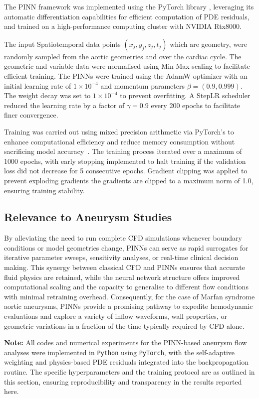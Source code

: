 \documentclass{article}
\begin{document}
The PINN framework was implemented using the PyTorch library \citep{paszke2019pytorch}, leveraging its automatic differentiation capabilities for efficient computation of PDE residuals, and trained on a high-performance computing cluster with NVIDIA Rtx8000. 

The input Spatiotemporal data points $(x_j, y_j, z_j, t_j)$ which are geometry, were randomly sampled from the aortic geometries and over the cardiac cycle. The geometric and variable data were normalised using Min-Max scaling to facilitate efficient training. The PINNs were trained using the AdamW optimizer \citep{loshchilov2017decoupled} with an initial learning rate of $1 \times 10^{-4}$ and momentum parameters $\beta = (0.9, 0.999)$. The weight decay was set to $1 \times 10^{-4}$ to prevent overfitting. A StepLR scheduler reduced the learning rate by a factor of $\gamma = 0.9$ every 200 epochs to facilitate finer convergence.

Training was carried out using mixed precision arithmetic via PyTorch's to enhance computational efficiency and reduce memory consumption without sacrificing model accuracy~\cite{micikevicius2017mixed}. The training process iterated over a maximum of 1000 epochs, with early stopping implemented to halt training if the validation loss did not decrease for 5 consecutive epochs. Gradient clipping was applied to prevent exploding gradients the gradients are clipped to a maximum norm of 1.0, ensuring training stability.

\subsection{Relevance to Aneurysm Studies}
By alleviating the need to run complete CFD simulations whenever boundary conditions or model geometries change, PINNs can serve as rapid surrogates for iterative parameter sweeps, sensitivity analyses, or real-time clinical decision making. This synergy between classical CFD and PINNs ensures that accurate fluid physics are retained, while the neural network structure offers improved computational scaling and the capacity to generalise to different flow conditions with minimal retraining overhead. Consequently, for the case of Marfan syndrome aortic aneurysms, PINNs provide a promising pathway to expedite hemodynamic evaluations and explore a variety of inflow waveforms, wall properties, or geometric variations in a fraction of the time typically required by CFD alone.


\vspace{2em}
\noindent\textbf{Note:} All codes and numerical experiments for the PINN-based aneurysm flow analyses were implemented in \texttt{Python} using \texttt{PyTorch}, with the self-adaptive weighting and physics-based PDE residuals integrated into the backpropagation routine. The specific hyperparameters and the training protocol are as outlined in this section, ensuring reproducibility and transparency in the results reported here.
\end{document}
